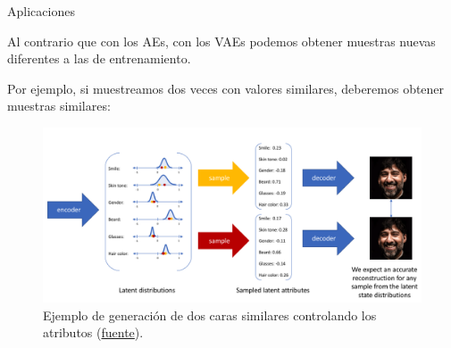 \begin{frame}{Aplicaciones}

Al contrario que con los AEs, con los VAEs podemos obtener muestras nuevas diferentes a las de entrenamiento.

Por ejemplo, si muestreamos dos veces con valores similares, deberemos obtener muestras similares:

\begin{figure}
    \centering
    \includegraphics[width=.7\textwidth]{Slides/figures/02_Metodos_Generativos/vae-face-generator-smile_pds-example.png}
    \caption{Ejemplo de generación de dos caras similares controlando los atributos (\href{https://www.jeremyjordan.me/variational-autoencoders/}{fuente}).}
    \label{fig:enter-label}
\end{figure}
    
\end{frame}


